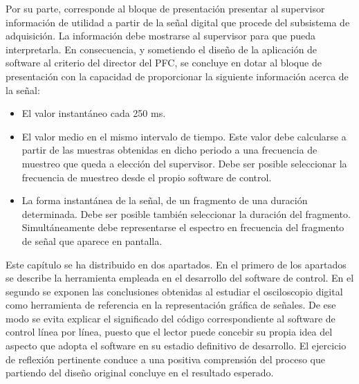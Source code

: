 Por su parte, corresponde al bloque de presentación presentar al supervisor
información de utilidad a partir de la señal digital que procede del
subsistema de adquisición. La información debe mostrarse al supervisor para
que pueda interpretarla. En consecuencia, y sometiendo el diseño de la
aplicación de software al criterio del director del PFC, se concluye en
dotar al bloque de presentación con la capacidad de proporcionar la
siguiente información acerca de la señal:

\begin{itemize}
	\item El valor instantáneo cada 250 ms.
	\item El valor medio en el mismo intervalo de tiempo. Este valor
		debe calcularse a partir de las muestras obtenidas en dicho
		periodo a una frecuencia de muestreo que queda a elección
		del supervisor. Debe ser posible seleccionar la frecuencia
		de muestreo desde el propio software de control.
	\item La forma instantánea de la señal, de un fragmento de una
		duración determinada. Debe ser posible también seleccionar
		la duración del fragmento. Simultáneamente debe
		representarse el espectro en frecuencia del fragmento de
		señal que aparece en pantalla.
\end{itemize}

Este capítulo se ha distribuido en dos apartados. En el primero de los
apartados se describe la herramienta empleada en el desarrollo del software
de control. En el segundo se exponen las conclusiones obtenidas al estudiar
el osciloscopio digital como herramienta de referencia en la representación
gráfica de señales. De ese modo se evita explicar el significado del código
correspondiente al software de control línea por línea, puesto que el
lector puede concebir su propia idea del aspecto que adopta el software en
su estadio definitivo de desarrollo. El ejercicio de reflexión pertinente
conduce a una positiva comprensión del proceso que partiendo del diseño
original concluye en el resultado esperado.

%
%

